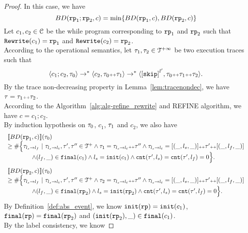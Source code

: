 \begin{proof}
In this case, we have
\[
  BD(\rprog_1; \rprog_2, c) = \min \left\{BD(\rprog_1, c), BD(\rprog_2, c) \right\}
\]
Let $c_1, c_2 \in \mathcal{C}$ be the while program corresponding to $\mathtt{rp}_1$ and $\mathtt{rp}_2$ such that $\mathtt{Rewrite}(c_1) = \mathtt{rp}_1$ and $\mathtt{Rewrite}(c_2) = \mathtt{rp}_2$.
\\
According to the operational semantics, let $\mathtt{\tau}_1, \mathtt{\tau}_2 \in \mathcal{T}^{+\infty}$ be two execution traces such that 
\[
  \config{c_1; c_2, \trace_0} \to^* \config{c_2, \trace_0 \tracecat \trace_1} \to^* \config{\clabel{\eskip}^{l'}, \trace_0 \tracecat \trace_1 \tracecat \trace_2}.
\]
By the trace non-decreasing property in Lemma~\ref{lem:tracenondec}, we have $\mathtt{\tau} = \mathtt{\tau}_1 {\scriptscriptstyle ++} \mathtt{\tau}_2$.
\\
According to the Algorithm~\ref{alg:alg-refine_rewrite} and REFINE algorithm, we have $c = c_1; c_2$.
\\
By induction hypothesis on $\mathtt{\tau}_0$, $c_1$, $\mathtt{\tau}_1$ and $c_2$, we also have
\[
  \begin{array}{l}
    \llbracket BD(\mathtt{rp}_1, c) \rrbracket(\mathtt{\tau}_0)
    \\ \geq
    \# \Big\{\mathtt{\tau}_{l_s \to l_f} ~\vert~ \mathtt{\tau}_{l_s \to l_t}, \mathtt{\tau}', \mathtt{\tau}''\in \mathcal{T}^{+}
    \land \mathtt{\tau}_1 = \mathtt{\tau}_{l_s \to l_t} {\scriptscriptstyle ++} \mathtt{\tau}''
    \land \mathtt{\tau}_{l_s \to l_t} = [(\_, l_s, \_)] {\scriptscriptstyle ++} \mathtt{\tau}' {\scriptscriptstyle ++} [(\_, l_f, \_)]
    \\ \qquad \qquad
    \land (l_{f}, \_) \in \mathtt{final}(c_1)
    \land l_s = \mathtt{init}(c_1)
    \land \mathtt{cnt}(\mathtt{\tau}', l_s) = \mathtt{cnt}(\mathtt{\tau}', l_f) = 0 
    \Big\}.
    \end{array}
\]
%
\[
  \begin{array}{l}
    \llbracket BD(\mathtt{rp}_2, c) \rrbracket(\mathtt{\tau}_0)
    \\ \geq
    \# \Big\{\mathtt{\tau}_{l_s \to l_f} ~\vert~ \mathtt{\tau}_{l_s \to l_t}, \mathtt{\tau}', \mathtt{\tau}''\in \mathcal{T}^{+}
    \land \mathtt{\tau}_2 = \mathtt{\tau}_{l_s \to l_t} {\scriptscriptstyle ++} \mathtt{\tau}''
    \land \mathtt{\tau}_{l_s \to l_t} = [(\_, l_s, \_)] {\scriptscriptstyle ++} \mathtt{\tau}' {\scriptscriptstyle ++} [(\_, l_f, \_)]
    \\ \qquad \qquad
    \land (l_{f}, \_) \in \mathtt{final}(\mathtt{rp}_2)
    \land l_s = \mathtt{init}(\mathtt{rp}_2)
    \land \mathtt{cnt}(\mathtt{\tau}', l_s) = \mathtt{cnt}(\mathtt{\tau}', l_f) = 0 
    \Big\}.
    \end{array}
\]
By Definition~\ref{def:abs_event}, we know
$\mathtt{init}(\mathtt{rp}) = \mathtt{init}(c_1)$, $\mathtt{final}(\mathtt{rp}) = \mathtt{final}(\mathtt{rp}_2)$ and $(\mathtt{init}(\mathtt{rp}_2), \_) \in \mathtt{final}(c_1)$. 
\\
By the label consistency, we know 

\end{proof}
